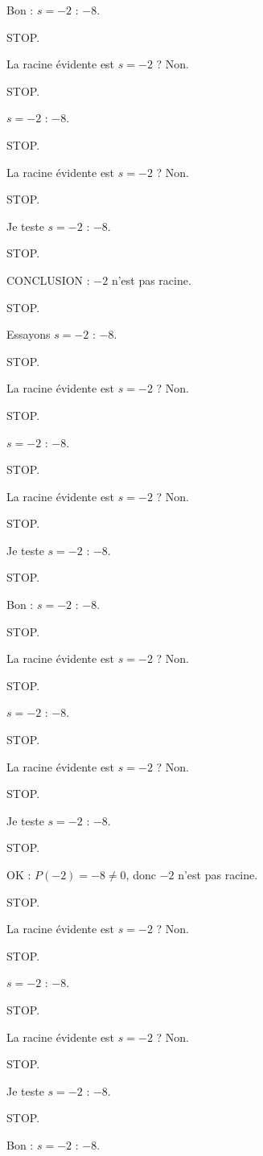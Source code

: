 \documentclass[11pt]{article}
\begin{document}
\begin{exoresolu}
\begin{enumerate}
Bon : $s = -2$ : $-8$. 

STOP. 

La racine évidente est $s = -2$ ? Non. 

STOP. 

$s = -2$ : $-8$. 

STOP. 

La racine évidente est $s = -2$ ? Non. 

STOP. 

Je teste $s = -2$ : $-8$. 

STOP. 

CONCLUSION : $-2$ n'est pas racine. 

STOP. 

Essayons $s = -2$ : $-8$. 

STOP. 

La racine évidente est $s = -2$ ? Non. 

STOP. 

$s = -2$ : $-8$. 

STOP. 

La racine évidente est $s = -2$ ? Non. 

STOP. 

Je teste $s = -2$ : $-8$. 

STOP. 

Bon : $s = -2$ : $-8$. 

STOP. 

La racine évidente est $s = -2$ ? Non. 

STOP. 

$s = -2$ : $-8$. 

STOP. 

La racine évidente est $s = -2$ ? Non. 

STOP. 

Je teste $s = -2$ : $-8$. 

STOP. 

OK : $P(-2) = -8 \neq 0$, donc $-2$ n'est pas racine. 

STOP. 

La racine évidente est $s = -2$ ? Non. 

STOP. 

$s = -2$ : $-8$. 

STOP. 

La racine évidente est $s = -2$ ? Non. 

STOP. 

Je teste $s = -2$ : $-8$. 

STOP. 

Bon : $s = -2$ : $-8$. 


\end{enumerate}
\end{exoresolu}
\end{document}

